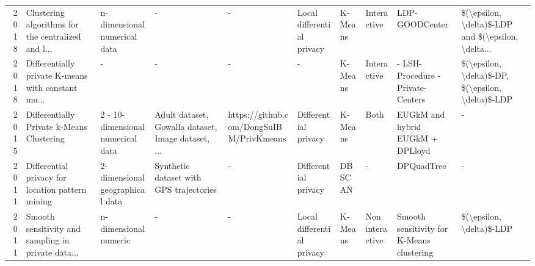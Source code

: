 \begin{landscape}
\begin{table}[ht]
\begin{adjustbox}{width=1.8\textwidth}
\begin{tabular}{rlllllllll}
        2018              & Clustering algorithms for the centralized and l...                                                            & n-dimensional numerical data         & -                                                  & -                                       & Local differential privacy & K-Means             & Interactive     & LDP-GOODCenter                            & \$(\textbackslash epsilon, \textbackslash delta)\$-LDP and \$(\textbackslash epsilon, \textbackslash delta... \\
        2018              & Differentially private K-means with constant mu...                                                            & -                                    & -                                                  & -                                       & -                          & K-Means             & Interactive     & - LSH-Procedure
        - Private-Centers & \$(\textbackslash epsilon, \textbackslash delta)\$-DP, \$(\textbackslash epsilon, \textbackslash delta)\$-LDP                                                                                                                                                                                                                                                                                                                                                                        \\
        2015              & Differentially Private k-Means Clustering                                                                     & 2 - 10-dimensional numerical data    & Adult dataset, Gowalla dataset, Image dataset, ... & https://github.com/DongSuIBM/PrivKmeans & Differential privacy       & K-Means             & Both            & EUGkM and hybrid EUGkM + DPLloyd          & -                                                                                                             \\
        2011              & Differential privacy for location pattern mining                                                              & 2-dimensional geographical data      & Synthetic dataset with GPS trajectories            & -                                       & Differential privacy       & DBSCAN              & -               & DPQuadTree                                & -                                                                                                             \\
        2011              & Smooth sensitivity and sampling in private data...                                                            & n-dimensional numeric                & -                                                  & -                                       & Local differential privacy & K-Means             & Non interactive & Smooth sensitivity for K-Means clustering & \$(\textbackslash epsilon, \textbackslash delta)\$-LDP                                                        \\

\end{tabular}
\end{adjustbox}
\end{table}
\end{landscape}
